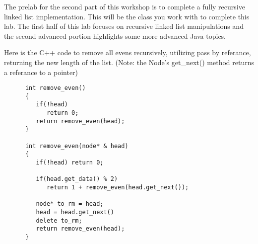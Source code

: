 \documentclass[../../main.tex]{subfiles}
\begin{document}
The prelab for the second part of this workshop is to complete a fully
recursive linked list implementation. This will be the class you work
with to complete this lab. The first half of this lab focuses on
recursive linked list manipulations and the second advanced portion
highlights some more advanced Java topics.

\begin{steps}
   \item Here is the C++ code to remove all evens recursively, utilizing pass by referance, returning the
      new length of the list. (Note: the Node's get_next() method returns a referance to a pointer)
      \begin{verbatim}
      int remove_even()
      {
         if(!head)
            return 0;
         return remove_even(head);
      }

      int remove_even(node* & head)
      {
         if(!head) return 0;

         if(head.get_data() % 2)
            return 1 + remove_even(head.get_next());

         node* to_rm = head;
         head = head.get_next()
         delete to_rm;
         return remove_even(head);
      }
      \end{verbatim}


\end{steps}
\end{document}
